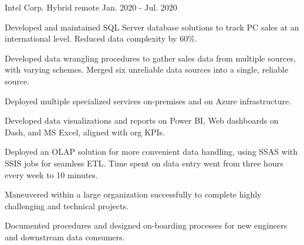 \begin{cventries}
	{Intel Corp.} %
	{Hybrid remote} %
	{Jan. 2020 {-} Jul. 2020} %
	{
		\begin{cvitems}
			\item {Developed and maintained SQL Server database solutions to track PC sales at an international level. Reduced data complexity by 60\%.}
			\item {Developed data wrangling procedures to gather sales data from multiple sources, with varying schemes. Merged six unreliable data sources into a single, reliable source.}
			\item {Deployed multiple specialized services on-premises and on Azure infrastructure.}
			\item {Developed data visualizations and reports on Power BI, Web dashboards on Dash, and MS Excel, aligned with org KPIs.}
			\item {Deployed an OLAP solution for more convenient data handling, using SSAS with SSIS jobs for seamless ETL. Time spent on data entry went from three hours every week to 10 minutes.}
			\item {Maneuvered within a large organization successfully to complete highly challenging and technical projects.}
			\item {Documented procedures and designed on-boarding processes for new engineers and downstream data consumers.}
		\end{cvitems}
	}
\end{cventries}
